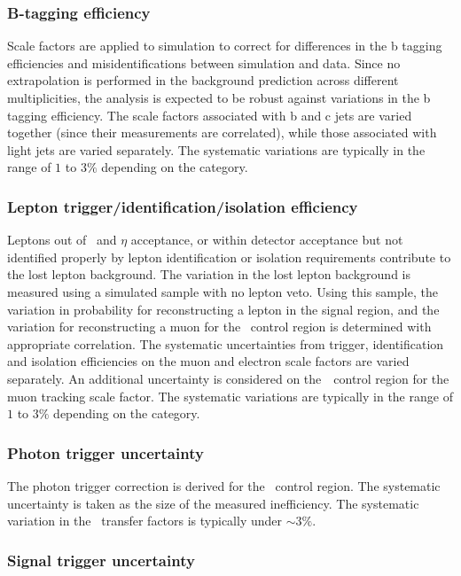 \subsubsection{B-tagging efficiency}

Scale factors are applied to simulation to correct for differences in the 
b tagging efficiencies and misidentifications between simulation and data. 
Since no extrapolation is performed in the background prediction across different 
\nb~ multiplicities, the analysis is expected to be robust against variations in the 
b tagging efficiency. The scale factors associated with b and c jets are varied together 
(since their measurements are correlated), while those associated with light jets are varied separately.
The systematic variations are typically in the range of $1$ to $3\%$ depending on the category.

\subsubsection{Lepton trigger/identification/isolation efficiency}

Leptons out of \pt~and $\eta$ acceptance, or within detector
acceptance but not identified properly by lepton identification or isolation
requirements contribute to the lost lepton background. The variation 
in the lost lepton background is measured using a simulated sample with no lepton veto.
Using this sample, the variation in probability for reconstructing a lepton in the signal region,
and the variation for reconstructing a muon for the \mj~control region is determined with 
appropriate correlation. The systematic uncertainties from trigger, identification and 
isolation efficiencies on the muon and electron scale factors are varied separately. 
An additional uncertainty is considered on the~\mj~control region for the muon tracking
scale factor. The systematic variations are typically in the range of $1$ to $3\%$ depending on the category.

\subsubsection{Photon trigger uncertainty}
The photon trigger correction is derived for the \gj~control region. The systematic uncertainty is
taken as the size of the measured inefficiency. The systematic variation in the \gj~transfer factors 
is typically under $\sim3\%$.

\subsubsection{Signal trigger uncertainty}


